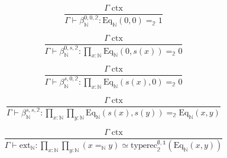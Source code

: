\documentclass{book}
\begin{document}
$$\frac{\Gamma \; \mathrm{ctx}}{\Gamma \vdash \beta_\mathbb{N}^{0, 0, \mathbb{2}}:\mathrm{Eq}_\mathbb{N}(0, 0) =_\mathbb{2} 1}$$

$$\frac{\Gamma \; \mathrm{ctx}}{\Gamma \vdash \beta_\mathbb{N}^{0, s, \mathbb{2}}:\prod_{x:\mathbb{N}} \mathrm{Eq}_\mathbb{N}(0, s(x)) =_\mathbb{2} 0}$$

$$\frac{\Gamma \; \mathrm{ctx}}{\Gamma \vdash \beta_\mathbb{N}^{s, 0, \mathbb{2}}:\prod_{x:\mathbb{N}} \mathrm{Eq}_\mathbb{N}(s(x), 0) =_\mathbb{2} 0}$$

$$\frac{\Gamma \; \mathrm{ctx}}{\Gamma \vdash \beta_\mathbb{N}^{s, s, \mathbb{2}}:\prod_{x:\mathbb{N}} \prod_{y:\mathbb{N}} \mathrm{Eq}_\mathbb{N}(s(x), s(y)) =_\mathbb{2} \mathrm{Eq}_\mathbb{N}(x, y)}$$

$$\frac{\Gamma \; \mathrm{ctx}}{\Gamma \vdash \mathrm{ext}_\mathbb{N}:\prod_{x:\mathbb{N}} \prod_{y:\mathbb{N}} (x =_{\mathbb{N}} y) \simeq \mathrm{typerec}_\mathbb{2}^{\emptyset, \mathbb{1}}(\mathrm{Eq}_\mathbb{N}(x, y))}$$
\end{document}
